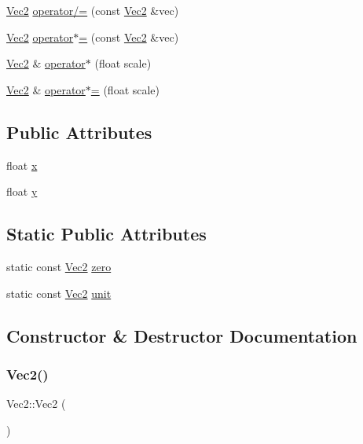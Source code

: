 \begin{DoxyCompactItemize}
\mbox{\hyperlink{struct_vec2}{Vec2}} \mbox{\hyperlink{struct_vec2_afdf4316abb4b2a286886bb1e85be783d}{operator/=}} (const \mbox{\hyperlink{struct_vec2}{Vec2}} \&vec)
\item 
\mbox{\hyperlink{struct_vec2}{Vec2}} \mbox{\hyperlink{struct_vec2_a1e277c51fc1cb0440e7b0247805c0f86}{operator$\ast$=}} (const \mbox{\hyperlink{struct_vec2}{Vec2}} \&vec)
\item 
\mbox{\hyperlink{struct_vec2}{Vec2}} \& \mbox{\hyperlink{struct_vec2_a9dfc7d928d6f12e90067538e7ac20903}{operator$\ast$}} (float scale)
\item 
\mbox{\hyperlink{struct_vec2}{Vec2}} \& \mbox{\hyperlink{struct_vec2_a4a32a53db5ca84b91028d4ee60630411}{operator$\ast$=}} (float scale)
\end{DoxyCompactItemize}
\subsection*{Public Attributes}
\begin{DoxyCompactItemize}
\item 
float \mbox{\hyperlink{struct_vec2_adf8ee322d4b4bcc04146762c018d731f}{x}}
\item 
float \mbox{\hyperlink{struct_vec2_a30543787e62f6d915543cf1dfb04c094}{y}}
\end{DoxyCompactItemize}
\subsection*{Static Public Attributes}
\begin{DoxyCompactItemize}
\item 
static const \mbox{\hyperlink{struct_vec2}{Vec2}} \mbox{\hyperlink{struct_vec2_a79378f8c63a15abc98bf639c839f345e}{zero}}
\item 
static const \mbox{\hyperlink{struct_vec2}{Vec2}} \mbox{\hyperlink{struct_vec2_a2350eb6448cb5b550f63842929423ce0}{unit}}
\end{DoxyCompactItemize}


\subsection{Constructor \& Destructor Documentation}
\mbox{\label{struct_vec2_a76080feed7005893ecc634f903cfbae0}} 
\subsubsection{\texorpdfstring{Vec2()}{Vec2()}\hspace{0.1cm}{\footnotesize\ttfamily [1/2]}}
{\footnotesize\ttfamily Vec2\+::\+Vec2 (\begin{DoxyParamCaption}{ }\end{DoxyParamCaption})}


